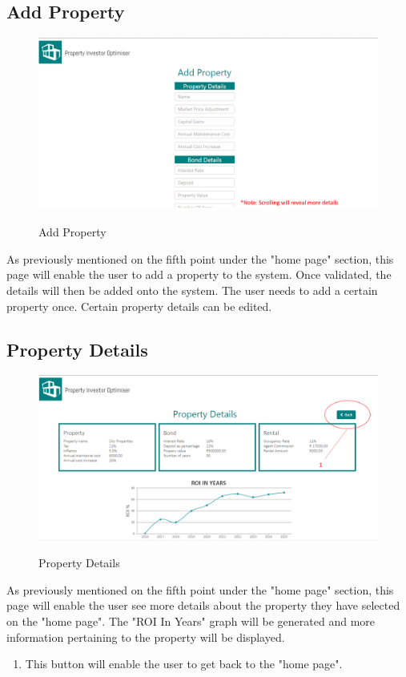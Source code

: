 \documentclass[a4paper,12pt]{article}
\begin{document}
\subsection{Add Property}
	\begin{figure}[H]
		\includegraphics[width=0.9\linewidth, center]{./System/AddProperty.PNG}\\[0.4cm]  
		\caption{Add Property}
	\end{figure}
As previously mentioned on the fifth point under the "home page" section, this page will enable the user to add a property to the system. Once validated, the details will then be added onto the system. The user needs to add a certain property once. Certain property details can be edited.  

\subsection{Property Details}
	\begin{figure}[H]
		\includegraphics[width=0.9\linewidth, center]{./System/PropertyDetails.PNG}\\[0.4cm]  
		\caption{Property Details}
	\end{figure}
	As previously mentioned on the fifth point under the "home page" section, this page will enable the user see more details 			about the property they have selected on the "home page". The "ROI In Years" graph will be generated and more information 			pertaining to the property will be displayed.  
	\begin{enumerate}
		\item This button will enable the user to get back to the "home page".
	\end{enumerate}
\end{document}
